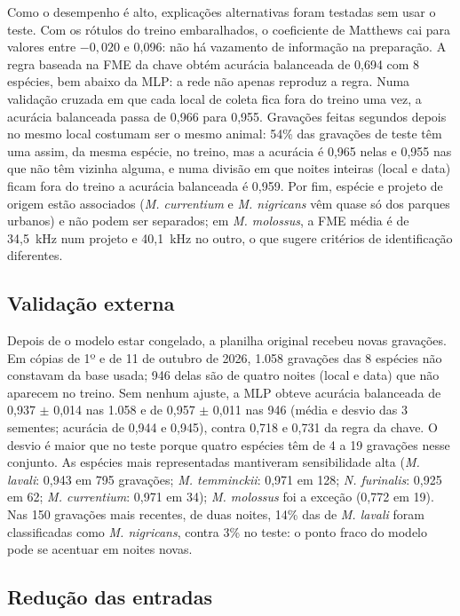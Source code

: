 \documentclass{sbrt}
\begin{document}
Como o desempenho é alto, explicações alternativas foram testadas sem usar o teste. Com os rótulos do treino embaralhados, o coeficiente de Matthews cai para valores entre $-0{,}020$ e 0,096: não há vazamento de informação na preparação. A regra baseada na FME da chave obtém acurácia balanceada de 0,694 com 8 espécies, bem abaixo da MLP: a rede não apenas reproduz a regra. Numa validação cruzada em que cada local de coleta fica fora do treino uma vez, a acurácia balanceada passa de 0,966 para 0,955. Gravações feitas segundos depois no mesmo local costumam ser o mesmo animal: 54\% das gravações de teste têm uma assim, da mesma espécie, no treino, mas a acurácia é 0,965 nelas e 0,955 nas que não têm vizinha alguma, e numa divisão em que noites inteiras (local e data) ficam fora do treino a acurácia balanceada é 0,959. Por fim, espécie e projeto de origem estão associados (\textit{M. currentium} e \textit{M. nigricans} vêm quase só dos parques urbanos) e não podem ser separados; em \textit{M. molossus}, a FME média é de 34,5~kHz num projeto e 40,1~kHz no outro, o que sugere critérios de identificação diferentes.

\subsection{Validação externa}

Depois de o modelo estar congelado, a planilha original recebeu novas gravações. Em cópias de 1º e de 11 de outubro de 2026, 1.058 gravações das 8 espécies não constavam da base usada; 946 delas são de quatro noites (local e data) que não aparecem no treino. Sem nenhum ajuste, a MLP obteve acurácia balanceada de 0,937 $\pm$ 0,014 nas 1.058 e de 0,957 $\pm$ 0,011 nas 946 (média e desvio das 3 sementes; acurácia de 0,944 e 0,945), contra 0,718 e 0,731 da regra da chave. O desvio é maior que no teste porque quatro espécies têm de 4 a 19 gravações nesse conjunto. As espécies mais representadas mantiveram sensibilidade alta (\textit{M. lavali}: 0,943 em 795 gravações; \textit{M. temminckii}: 0,971 em 128; \textit{N. furinalis}: 0,925 em 62; \textit{M. currentium}: 0,971 em 34); \textit{M. molossus} foi a exceção (0,772 em 19). Nas 150 gravações mais recentes, de duas noites, 14\% das de \textit{M. lavali} foram classificadas como \textit{M. nigricans}, contra 3\% no teste: o ponto fraco do modelo pode se acentuar em noites novas.

\subsection{Redução das entradas}\label{sec:entradas}
\end{document}
